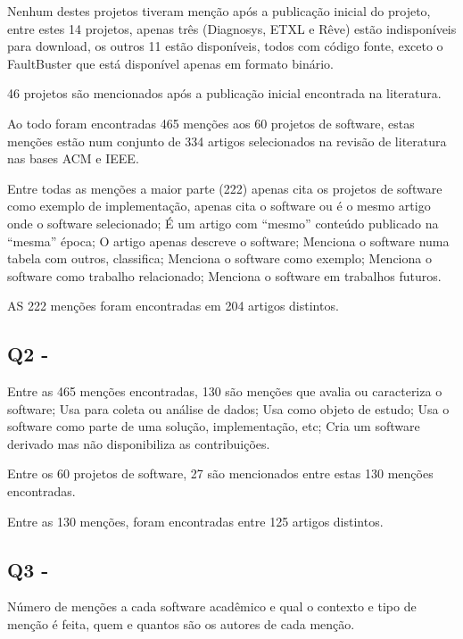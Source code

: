 Nenhum destes projetos tiveram menção após a publicação inicial do projeto,
entre estes 14 projetos, apenas três (Diagnosys, ETXL e Rêve) estão
indisponíveis para download, os outros 11 estão disponíveis, todos com código
fonte, exceto o FaultBuster que está disponível apenas em formato binário.

46 projetos são mencionados após a publicação inicial encontrada na literatura.

Ao todo foram encontradas 465 menções aos 60 projetos de software, estas
menções estão num conjunto de 334 artigos selecionados na revisão de literatura
nas bases ACM e IEEE.

Entre todas as menções a maior parte (222) apenas cita os projetos de software
como exemplo de implementação, apenas cita o software ou é o mesmo artigo onde
o software selecionado; É um artigo com “mesmo” conteúdo publicado na “mesma”
época; O artigo apenas descreve o software; Menciona o software numa tabela com
outros, classifica; Menciona o software como exemplo; Menciona o software como
trabalho relacionado; Menciona o software em trabalhos futuros.


AS 222 menções foram encontradas em 204 artigos distintos.

\subsection{Q2 - \EstudoDoisQuestaoDois}

Entre as 465 menções encontradas, 130 são menções que avalia ou caracteriza o
software; Usa para coleta ou análise de dados; Usa como objeto de estudo; Usa o
software como parte de uma solução, implementação, etc; Cria um software
derivado mas não disponibiliza as contribuições.

Entre os 60 projetos de software, 27 são mencionados entre estas 130 menções
encontradas.


Entre as 130 menções, foram encontradas entre 125 artigos distintos.

\subsection{Q3 - \EstudoDoisQuestaoTres}

Número de menções a cada software acadêmico e qual o contexto e tipo de menção
é feita, quem e quantos são os autores de cada menção.

